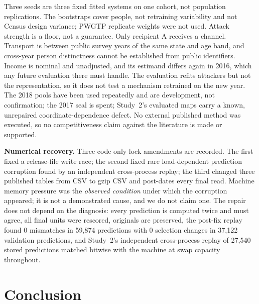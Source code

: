 \documentclass[10pt]{article}
\begin{document}
Three seeds are three fixed fitted systems on one cohort, not population replications. The
bootstraps cover people, not retraining variability and not Census design variance; PWGTP replicate
weights were not used. Attack strength is a floor, not a guarantee. Only recipient A receives a
channel. Transport is between public survey years of the same state and age band, and cross-year
person distinctness cannot be established from public identifiers. Income is nominal and
unadjusted, and its estimand differs again in 2016, which any future evaluation there must handle.
The evaluation refits attackers but not the representation, so it does not test a mechanism
retrained on the new year. The 2018 pools have been used repeatedly and are development, not
confirmation; the 2017 seal is spent; Study~2's evaluated maps carry a known, unrepaired
coordinate-dependence defect. No external published method was executed, so no competitiveness
claim against the literature is made or supported.

\textbf{Numerical recovery.} Three code-only lock amendments are recorded. The first fixed a
release-file write race; the second fixed rare load-dependent prediction corruption found by an
independent cross-process replay; the third changed three published tables from CSV to gzip CSV and
post-dates every final read. Machine memory pressure was the \emph{observed condition} under which
the corruption appeared; it is not a demonstrated cause, and we do not claim one. The repair does
not depend on the diagnosis: every prediction is computed twice and must agree, all final units were
rescored, originals are preserved, the post-fix replay found 0 mismatches in 59{,}874 predictions
with 0 selection changes in 37{,}122 validation predictions, and Study~2's independent
cross-process replay of 27{,}540 stored predictions matched bitwise with the machine at swap
capacity throughout.

\section{Conclusion}
\label{sec:conclusion}
\end{document}
